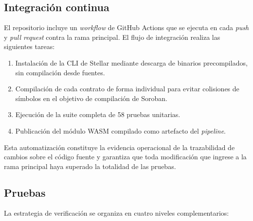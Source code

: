 \subsection{Integración continua}

El repositorio incluye un \textit{workflow} de GitHub Actions que se ejecuta en cada \textit{push} y
\textit{pull request} contra la rama principal. El flujo de integración realiza las siguientes tareas:

\begin{enumerate}\setlength{\itemsep}{2pt}
    \item Instalación de la CLI de Stellar mediante descarga de binarios precompilados, sin compilación desde
fuentes.
    \item Compilación de cada contrato de forma individual para evitar colisiones de símbolos en el objetivo
de compilación de Soroban.
    \item Ejecución de la suite completa de 58 pruebas unitarias.
    \item Publicación del módulo WASM compilado como artefacto del \textit{pipeline}.
\end{enumerate}

Esta automatización constituye la evidencia operacional de la trazabilidad de cambios sobre el código fuente
y garantiza que toda modificación que ingrese a la rama principal haya superado la totalidad de las pruebas.

\subsection{Pruebas}

La estrategia de verificación se organiza en cuatro niveles complementarios:

